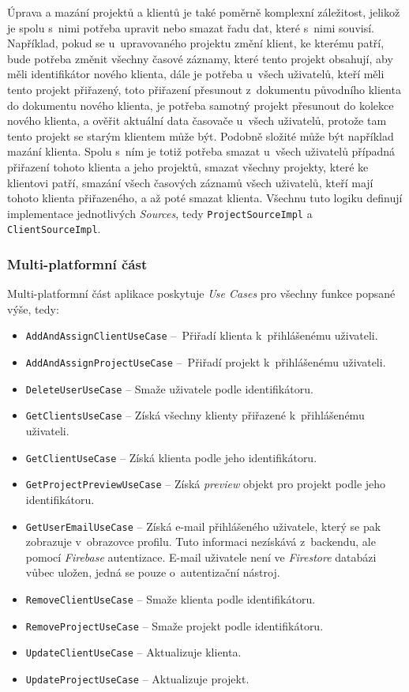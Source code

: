 Úprava a mazání projektů a klientů je také poměrně komplexní záležitost, jelikož je spolu s~nimi potřeba upravit nebo smazat řadu dat, které s~nimi souvisí. Například, pokud se u~upravovaného projektu změní klient, ke kterému patří, bude potřeba změnit všechny časové záznamy, které tento projekt obsahují, aby měli identifikátor nového klienta, dále je potřeba u~všech uživatelů, kteří měli tento projekt přiřazený, toto přiřazení přesunout z~dokumentu původního klienta do dokumentu nového klienta, je potřeba samotný projekt přesunout do kolekce nového klienta, a ověřit aktuální data časovače u~všech uživatelů, protože tam tento projekt se starým klientem může být. Podobně složité může být například mazání klienta. Spolu s~ním je totiž potřeba smazat u~všech uživatelů případná přiřazení tohoto klienta a jeho projektů, smazat všechny projekty, které ke klientovi patří, smazání všech časových záznamů všech uživatelů, kteří mají tohoto klienta přiřazeného, a až poté smazat klienta. Všechnu tuto logiku definují implementace jednotlivých \emph{Sources}, tedy \texttt{ProjectSourceImpl} a \texttt{ClientSourceImpl}.

\subsubsection{Multi-platformní část}

Multi-platformní část aplikace poskytuje \emph{Use Cases} pro všechny funkce popsané výše, tedy:
\begin{itemize}
\item\texttt{AddAndAssignClientUseCase} – Přiřadí klienta k~přihlášenému uživateli.
\item\texttt{AddAndAssignProjectUseCase} – Přiřadí projekt k~přihlášenému uživateli.
\item\texttt{DeleteUserUseCase} – Smaže uživatele podle identifikátoru.
\item\texttt{GetClientsUseCase} – Získá všechny klienty přiřazené k~přihlášenému uživateli.
\item\texttt{GetClientUseCase} – Získá klienta podle jeho identifikátoru.
\item\texttt{GetProjectPreviewUseCase} – Získá \emph{preview} objekt pro projekt podle jeho identifikátoru.
\item\texttt{GetUserEmailUseCase} – Získá e-mail přihlášeného uživatele, který se pak zobrazuje v~obrazovce profilu. Tuto informaci nezískává z~backendu, ale pomocí \emph{Firebase} autentizace. E-mail uživatele není ve \emph{Firestore} databázi vůbec uložen, jedná se pouze o~autentizační nástroj.
\item\texttt{RemoveClientUseCase} – Smaže klienta podle identifikátoru.
\item\texttt{RemoveProjectUseCase} – Smaže projekt podle identifikátoru.
\item\texttt{UpdateClientUseCase} – Aktualizuje klienta.
\item\texttt{UpdateProjectUseCase} – Aktualizuje projekt.
\end{itemize}

